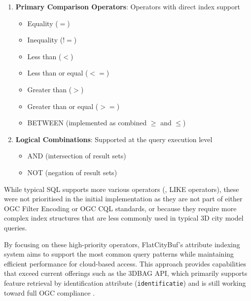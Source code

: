\begin{enumerate}
  \item \textbf{Primary Comparison Operators}: Operators with direct index support
    \begin{itemize}
      \item Equality ($=$)
      \item Inequality ($!=$)
      \item Less than ($<$)
      \item Less than or equal ($<=$)
      \item Greater than ($>$)
      \item Greater than or equal ($>=$)
      \item BETWEEN (implemented as combined $\geq$ and $\leq$)
    \end{itemize}

  \item \textbf{Logical Combinations}: Supported at the query execution level
    \begin{itemize}
      \item AND (intersection of result sets)
      \item NOT (negation of result sets)
    \end{itemize}

\end{enumerate}

While typical SQL supports more various operators (\eg, LIKE operators), these were not prioritised in the initial implementation as they are not part of either OGC Filter Encoding or OGC CQL standards, or because they require more complex index structures that are less commonly used in typical 3D city model queries.

By focusing on these high-priority operators, FlatCityBuf's attribute indexing system aims to support the most common query patterns while maintaining efficient performance for cloud-based access. This approach provides capabilities that exceed current offerings such as the 3DBAG API, which primarily supports feature retrieval by identification attribute (\texttt{identificatie}) and is still working toward full OGC compliance \citep{3dbag_api}.


